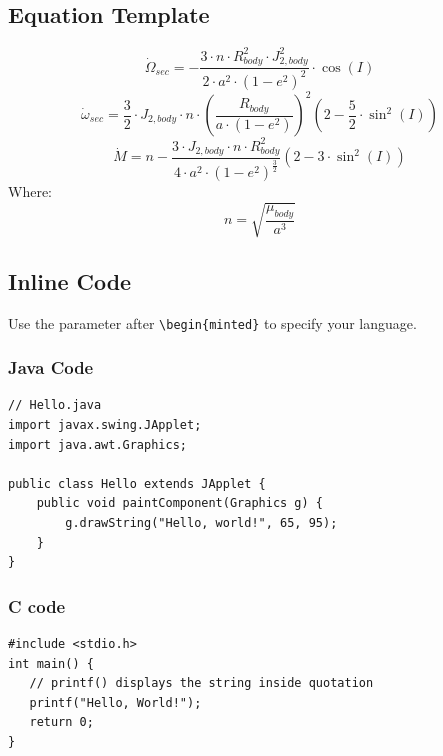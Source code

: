 \subsection{Equation Template}
\begin{equation}
    \dot\Omega_{sec}=-\frac{3\cdot n\cdot R_{body}^2 \cdot J_{2,body}^2}{2 \cdot a^2 \cdot (1-e^2)^2} \cdot \cos(I)
\end{equation}
\begin{equation}
    \dot\omega_{sec}=\frac{3}{2} \cdot J_{2,body} \cdot n \cdot \left(\frac{R_{body}}{a \cdot (1-e^2)}\right)^2\left(2-\frac{5}{2} \cdot \sin^2(I)\right)
\end{equation}
\begin{equation}
    \dot M=n-\frac{3 \cdot J_{2,body} \cdot n \cdot R^2_{body}}{4 \cdot a^2 \cdot (1-e^2)^{\frac{3}{2}}}(2-3 \cdot \sin^2(I))
\end{equation}
Where:
\begin{equation}
    n=\sqrt{\frac{\mu_{body}}{a^3}}
\end{equation}

\subsection{Inline Code}

Use the parameter after \verb|\begin{minted}| to specify your language.

\subsubsection{Java Code}
\begin{verbatim}
// Hello.java
import javax.swing.JApplet;
import java.awt.Graphics;

public class Hello extends JApplet {
    public void paintComponent(Graphics g) {
        g.drawString("Hello, world!", 65, 95);
    }    
}
\end{verbatim}

\subsubsection{C code}
\begin{verbatim}
#include <stdio.h>
int main() {
   // printf() displays the string inside quotation
   printf("Hello, World!");
   return 0;
}
\end{verbatim}

